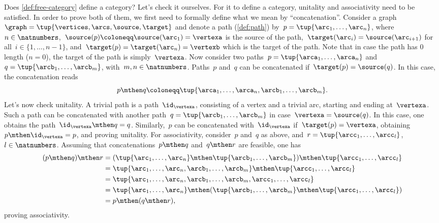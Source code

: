 Does \cref{def:free-category} define a category?
Let's check it ourselves.
For it to define a category, unitality and associativity need to be satisfied.
In order to prove both of them, we first need to formally define what we mean by ``concatenation''.
Consider a graph~$\graph=\tup{\vertices,\arcs,\source,\target}$ and denote a path (\cref{def:path}) by~$p=\tup{\arc_1,\ldots, \arc_n}$, where~$n\in \natnumbers$,~$\source(p)\coloneqq\source(\arc_1)=\vertexa$ is the source of the path,~$\target(\arc_i)=\source(\arc_{i+1})$ for all~$i\in \{1,\ldots,n-1\}$, and~$\target(p)=\target(\arc_n)=\vertexb$ which is the target of the path.
Note that in case the path has 0 length ($n=0$), the target of the path is simply~$\vertexa$.
Now consider two paths~$p=\tup{\arca_1,\ldots,\arca_n}$ and~$q=\tup{\arcb_1,\ldots,\arcb_m}$, with~$m,n\in \natnumbers$.
Paths~$p$ and~$q$ can be concatenated if~$\target(p)=\source(q)$.
In this case, the concatenation reads
\begin{equation*}
    p\mthen q\coloneqq \tup{\arca_1,\ldots, \arca_n,\arcb_1,\ldots,\arcb_m}.
\end{equation*}
Let's now check unitality.
A trivial path is a path~$\id_\vertexa$, consisting of a vertex and a trivial arc, starting and ending at~$\vertexa$.
Such a path can be concatenated with another path~$q=\tup{\arcb_1,\ldots,\arcb_m}$ in case~$\vertexa=\source(q)$.
In this case, one obtains the path~$\id_\vertexa \mthen q=q$.
Similarly,~$p$ can be concatenated with~$\id_\vertexa$ if~$\target(p)=\vertexa$, obtaining~$p\mthen \id_\vertexa=p$, and proving unitality.
For associativity, consider~$p$ and~$q$ as above, and~$r=\tup{\arcc_1,\ldots,\arcc_l}$,~$l\in \natnumbers$.
Assuming that concatenations~$p\mthen q$ and~$q\mthen r$ are feasible, one has
\begin{equation*}
\begin{aligned}
    (p\mthen q)\mthen r&=(\tup{\arc_1,\ldots, \arc_n}\mthen \tup{\arcb_1,\ldots,\arcb_m})\mthen \tup{\arcc_1,\ldots,\arcc_l}\\
    &=\tup{\arc_1,\ldots, \arc_n,\arcb_1,\ldots,\arcb_m}\mthen \tup{\arcc_1,\ldots,\arcc_l}\\
    &= \tup{\arc_1,\ldots, \arc_n,\arcb_1,\ldots,\arcb_m, \arcc_1,\ldots,\arcc_l}\\
    &=\tup{\arc_1,\ldots, \arc_n} \mthen (\tup{\arcb_1,\ldots,\arcb_m}\mthen \tup{\arcc_1,\ldots,\arcc_l})\\
    &=p\mthen (q\mthen r),
\end{aligned}
\end{equation*}
proving associativity.

